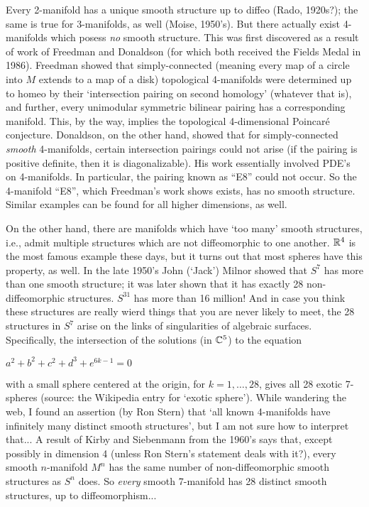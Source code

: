 Every 2-manifold has a unique smooth structure up to diffeo (Rado, 1920s?);
the same is true for 3-manifolds, as well (Moise, 1950's). 
But there actually exist 4-manifolds which
posess {\it no} smooth structure. This was first discovered as a result of work of
Freedman and Donaldson (for which both received the Fields Medal in 1986). Freedman
showed that simply-connected (meaning every map of
a circle into $M$ extends to a map of a disk) topological 4-manifolds were determined
up to homeo by their `intersection pairing on second homology' (whatever
that is), and further, every unimodular symmetric bilinear pairing has a corresponding manifold.
This, by the way, implies the topological 4-dimensional Poincar\'e conjecture.
Donaldson, on the other hand, showed that for simply-connected {\it smooth} 
4-manifolds, certain intersection pairings could not arise (if the pairing is
positive definite, then it is diagonalizable). His work essentially
involved PDE's on 4-manifolds. In particular, the
pairing known as ``E8'' could not occur. So the 4-manifold ``E8'', which Freedman's work shows
exists, has no smooth structure. Similar examples can be found for all 
higher dimensions, as well.

On the other hand, there are manifolds which have `too many' smooth structures, i.e., admit
multiple structures which are not diffeomorphic to one another. ${\Bbb R}^4$ is the most famous example
these days, but it turns out that most spheres have this property, as well. In the late 1950's
John (`Jack') Milnor showed that $S^7$ has more than one smooth structure; it was later shown that
it has exactly 28 non-diffeomorphic structures. $S^{31}$ has more than 16 million! And in case you
think these structures are really wierd things that you are never likely to meet, the 28
structures in $S^7$ arise on the links of singularities of algebraic surfaces. Specifically,
the intersection of the solutions (in ${\Bbb C}^5$) to the equation

\centerline{$a^2 + b^2 + c^2 + d^3 + e^{6k - 1} = 0$}

\noindent with a small sphere centered at the origin, for $k=1,\ldots ,28$, gives all
28 exotic 7-spheres (source: the Wikipedia entry for `exotic sphere').
While wandering the web, I found an assertion (by Ron Stern) that `all known 4-manifolds
have infinitely many distinct smooth structures', but I am not sure how to interpret that...
A result of Kirby and Siebenmann from the 1960's says that, except possibly in dimension 4
(unless Ron Stern's statement deals with it?), every smooth $n$-manifold $M^n$ has the same number
of non-diffeomorphic smooth structures as $S^n$ does. So {\it every} smooth 7-manifold has
28 distinct smooth structures, up to diffeomorphism...

